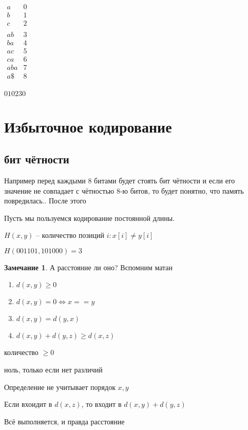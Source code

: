 \documentclass{book}
\theoremstyle{definition}
\newtheorem*{note}{Замечание}
\begin{document}
       $\begin{array}{cc}
           a&0\\b&1\\c&2\\&\\ab&3\\ba&4\\ac&5\\ca&6\\aba&7\\a\$&8\\
       \end{array}$

       $010230$

\section{Избыточное кодирование}

\subsection{бит чётности}
Например перед каждыми 8 битами будет стоять бит чётности и если его значение не совпадает с чётностью 8-ю битов, то будет понятно, что память повредилась.. После этого 

\begin{definition}
    Пусть мы пользуемся кодирование постоянной длины.

    $H(x, y)$ -- количество позиций  $i:x[i]\neq y[i]$

    $H(001101, 101000) = 3$
\end{definition}
\begin{note}
    А расстояние ли оно? Вспомним матан

    \begin{enumerate}
        \item $d(x, y)\geqslant 0$
        \item $d(x, y)=0 \iff x==y$ 
        \item  $d(x, y) = d(y,x)$
        \item $d(x, y) + d(y, z)\geqslant d(x, z)$
    \end{enumerate}

   количество $\geqslant 0$

   ноль, только если нет различий

   Определение не учитывает порядок $x, y$

   Если вхоидит в  $d(x, z)$, то входит в  $d(x, y) + d(y,z)$

   Всё выполняется, и правда расстояние
\end{note}
\end{document}
